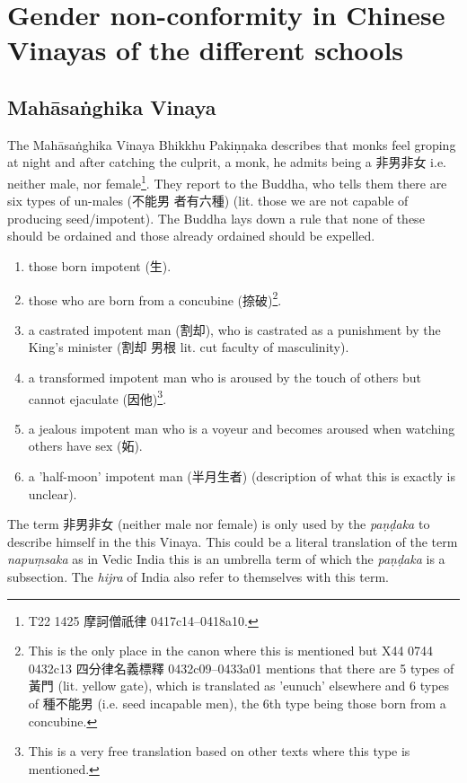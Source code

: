 \section{Gender non-conformity in Chinese Vinayas of the different schools}
\label{appendix1}

\subsection{Mahāsaṅghika Vinaya}
The Mahāsaṅghika Vinaya Bhikkhu Pakiṇṇaka describes that monks feel groping at night and after catching the culprit, a monk, he admits being a 非男非女 i.e. neither male, nor female\footnote{T22 1425 摩訶僧祇律 0417c14–0418a10.}. They report to the Buddha, who tells them there are six types of un-males (不能男 者有六種) (lit. those we are not capable of producing seed/impotent). The Buddha lays down a rule that none of these should be ordained and those already ordained should be expelled.

\begin{enumerate}
\item those born impotent (生). 
\item those who are born from a concubine (捺破)\footnote{This is the only place in the canon where this is mentioned but X44 0744 0432c13 四分律名義標釋 0432c09–0433a01 mentions that there are 5 types of 黃門 (lit. yellow gate), which is translated as 'eunuch' elsewhere and 6 types of 種不能男 (i.e. seed incapable men), the 6th type being those born from a concubine.}.
\item a castrated impotent man (割却), who is castrated as a punishment by the King's minister (割却 男根 lit. cut faculty of masculinity).
\item a transformed impotent man who is aroused by the touch of others but cannot ejaculate (因他)\footnote{This is a very free translation based on other texts where this type is mentioned.}.
\item a jealous impotent man who is a voyeur and becomes aroused when watching others have sex (妬).
\item a 'half-moon' impotent man (半月生者) (description of what this is exactly is unclear).
\end{enumerate}

The term 非男非女 (neither male nor female) is only used by the {\em paṇḍaka} to describe himself in the this Vinaya. This could be a literal translation of the term {\em napuṃsaka} as in Vedic India this is an umbrella term of which the {\em paṇḍaka} is a subsection. The {\em hijra} of India also refer to themselves with this term.


